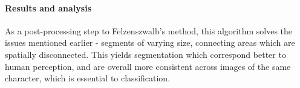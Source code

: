 \paragraph{Results and analysis} As a post-processing step to Felzenszwalb's method, this algorithm solves the issues mentioned earlier - segments of varying size, connecting areas which are spatially disconnected. This yields segmentation which correspond better to human perception, and are overall more consistent across images of the same character, which is essential to classification.